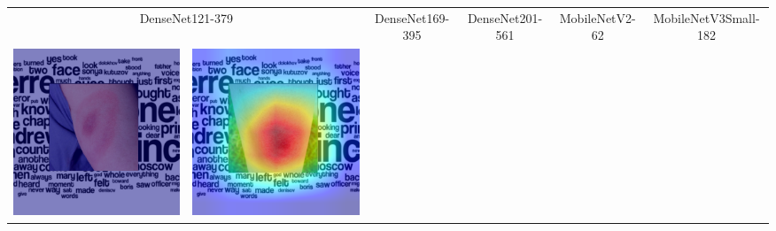 \begin{landscape}
\begin{table}[]
\begin{tabular}{@{}c c c c c c c c c c@{}}
			\multicolumn{2}{c}{DenseNet121-379} & \multicolumn{2}{c}{DenseNet169-395} & \multicolumn{2}{c}{DenseNet201-561} & \multicolumn{2}{c}{MobileNetV2-62} & \multicolumn{2}{c}{MobileNetV3Small-182}\\
			\includegraphics[width=.12\textheight ,keepaspectratio]{images/pretraining/gradcam/3/DenseNet121CombinedGradCam.png} &
			\includegraphics[width=.12\textheight ,keepaspectratio]{images/pretraining/gradcam/9/DenseNet121CombinedGradCam.png} &

\end{tabular}
\end{table}
\end{landscape}
